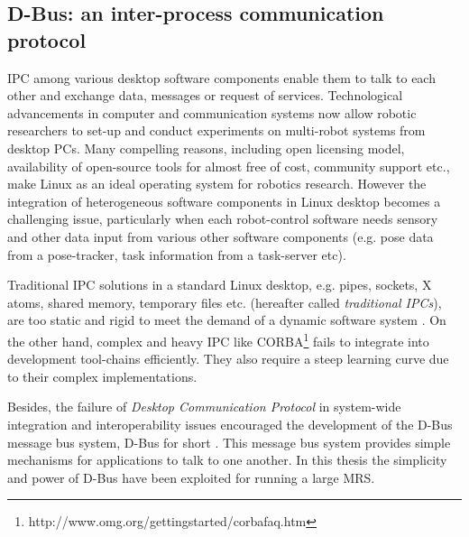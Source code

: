 \subsection{D-Bus: an inter-process communication protocol}
\label{expt-tools:dbus}
IPC among various desktop software components enable them to talk to each other and exchange data, messages or request of services. Technological advancements in computer and communication systems now allow robotic researchers to set-up and conduct experiments on multi-robot systems from desktop PCs. Many compelling reasons, including open licensing model, availability of open-source tools for almost free of cost, community support etc., make Linux as an ideal operating system for robotics research. However the integration of heterogeneous software components in Linux desktop becomes a challenging issue, particularly when each robot-control software needs sensory and other data input from various other software components (e.g. pose data from a pose-tracker, task information from a task-server etc).

Traditional IPC solutions in a standard Linux desktop, e.g. pipes, sockets, X atoms, shared memory, temporary files etc. (hereafter called {\em traditional IPCs}), are too static and rigid to meet the demand of a dynamic software system \cite{wittenburg2005}. On the other hand, complex and heavy IPC like CORBA\footnote{http://www.omg.org/gettingstarted/corbafaq.htm} fails to integrate into development tool-chains efficiently. They also require a steep learning curve due to their complex implementations. 

Besides, the failure of \textit{Desktop Communication Protocol} in system-wide integration and interoperability issues encouraged the development of the D-Bus message bus system, D-Bus for short \cite{Pennington+2010}. This message bus system provides simple mechanisms for applications to talk to one another. In this thesis the simplicity and power of D-Bus have been exploited for running a large MRS.


